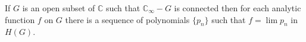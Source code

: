 If $G$ is an open subset of $\mathbb{C}$ such that $\mathbb{C}_{\infty} - G$ is connected then for each analytic function $f$ on $G$ there is a sequence of polynomials $\{p_n\}$ such that $f = \lim p_n$ in $H(G)$.
